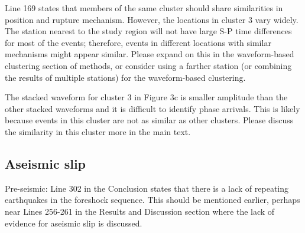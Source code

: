 \documentclass[10pt]{extarticle}
\begin{document}
\begin{ReviewerComment}{2}
\noindent 
Line 169 states that members of the same cluster should share similarities in position and rupture mechanism.  However, the locations in cluster 3 vary widely. The station nearest to the study region will not have large S-P time differences for most of the events; therefore, events in different locations with similar mechanisms might appear similar. Please expand on this in the waveform-based clustering section of methods, or consider using a farther station (or combining the results of multiple stations) for the waveform-based clustering.

\end{ReviewerComment}


\begin{Answer}
 \WorkInProgressRevTask
\end{Answer}
%
%



\begin{ReviewerComment}{2}
\noindent 
The stacked waveform for cluster 3 in Figure 3c is smaller amplitude than the other stacked waveforms and it is difficult to identify phase arrivals. This is likely because events in this cluster are not as similar as other clusters. Please discuss the similarity in this cluster more in the main text.

\end{ReviewerComment}


\begin{Answer}
 \WorkInProgressRevTask
\end{Answer}
%
%


\subsection*{Aseismic slip}


\begin{ReviewerComment}{2}
\noindent 
Pre-seismic: Line 302 in the Conclusion states that there is a lack of repeating earthquakes in the foreshock sequence. This should be mentioned earlier, perhaps near Lines 256-261 in the Results and Discussion section where the lack of evidence for aseismic slip is discussed.

\end{ReviewerComment}


\begin{Answer}
 \WorkInProgressRevTask
\end{Answer}
%
%
\end{document}

